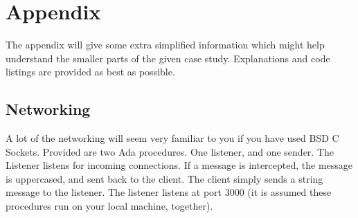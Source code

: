 \section{Appendix}
The appendix will give some extra simplified information which might help understand the smaller parts of the given case study. Explanations and code listings are provided as best as possible.

\subsection{Networking}
A lot of the networking will seem very familiar to you if you have used BSD C Sockets. Provided are two Ada procedures. One listener, and one sender. The Listener listens for incoming connections. If a message is intercepted, the message is uppercased, and sent back to the client. 
The client simply sends a string message to the listener. The listener listens at port 3000 (it is assumed these procedures run on your local machine, together).



